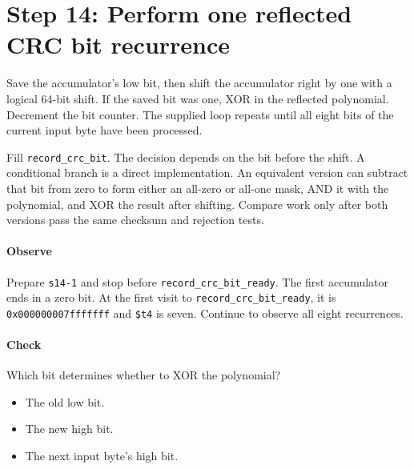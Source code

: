 \section{Step 14: Perform one reflected CRC bit recurrence}
Save the accumulator's low bit, then shift the accumulator right by one
with a logical 64-bit shift. If the saved bit was one, XOR in the reflected
polynomial. Decrement the bit counter. The supplied loop repeats until all eight
bits of the current input byte have been processed.

Fill \texttt{record\_crc\_bit}. The decision depends on the bit before the
shift. A conditional branch is a direct implementation. An equivalent version
can subtract that bit from zero to form either an all-zero or all-one mask, AND
it with the polynomial, and XOR the result after shifting. Compare work only
after both versions pass the same checksum and rejection tests.

\paragraph{Observe} Prepare \texttt{s14-1} and stop before
\texttt{record\_crc\_bit\_ready}. The first accumulator ends in a zero bit. At the first visit to
\texttt{record\_crc\_bit\_ready}, it is \texttt{0x000000007fffffff} and
\texttt{\$t4} is seven. Continue to observe all eight recurrences.

\paragraph{Check} Which bit determines whether to XOR the polynomial?
\begin{itemize}
\item[A.] The old low bit.
\item[B.] The new high bit.
\item[C.] The next input byte's high bit.
\end{itemize}
